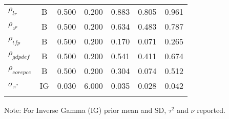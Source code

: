 \documentclass[12pt]{article}
\begin{document}
\begin{table}[h]
{\begin{tabular}{lcccccc}
$\rho_{lr}$ & B &    0.500 &    0.200 &    0.883 &    0.805 &    0.961 \\
$\rho_{z^p}$ & B &    0.500 &    0.200 &    0.634 &    0.483 &    0.787 \\
$\rho_{tfp}$ & B &    0.500 &    0.200 &    0.170 &    0.071 &    0.265 \\
$\rho_{gdpdef}$ & B &    0.500 &    0.200 &    0.541 &    0.411 &    0.674 \\
$\rho_{corepce}$ & B &    0.500 &    0.200 &    0.304 &    0.074 &    0.512 \\
$\sigma_{\pi^*}$ & IG &    0.030 &    6.000 &    0.035 &    0.028 &    0.042 \\
\\ \hline
\end{tabular}}
{\footnotesize Note: For Inverse Gamma (IG) prior mean and SD, $\tau^2$ and $\nu$
        reported.}
\end{table}
\end{document}

